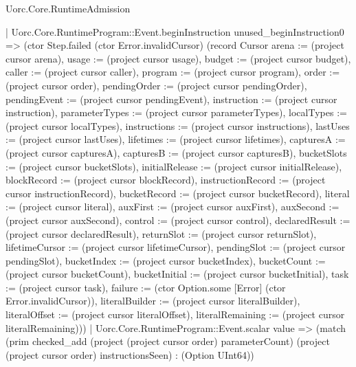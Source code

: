\begin{lexlean}{Uorc.Core.RuntimeAdmission}
\begin{semanticmodule}
{          | Uorc.Core.RuntimeProgram::Event.beginInstruction unused_beginInstruction0 => (ctor Step.failed (ctor Error.invalidCursor) (record Cursor {arena := (project cursor arena), usage := (project cursor usage), budget := (project cursor budget), caller := (project cursor caller), program := (project cursor program), order := (project cursor order), pendingOrder := (project cursor pendingOrder), pendingEvent := (project cursor pendingEvent), instruction := (project cursor instruction), parameterTypes := (project cursor parameterTypes), localTypes := (project cursor localTypes), instructions := (project cursor instructions), lastUses := (project cursor lastUses), lifetimes := (project cursor lifetimes), capturesA := (project cursor capturesA), capturesB := (project cursor capturesB), bucketSlots := (project cursor bucketSlots), initialRelease := (project cursor initialRelease), blockRecord := (project cursor blockRecord), instructionRecord := (project cursor instructionRecord), bucketRecord := (project cursor bucketRecord), literal := (project cursor literal), auxFirst := (project cursor auxFirst), auxSecond := (project cursor auxSecond), control := (project cursor control), declaredResult := (project cursor declaredResult), returnSlot := (project cursor returnSlot), lifetimeCursor := (project cursor lifetimeCursor), pendingSlot := (project cursor pendingSlot), bucketIndex := (project cursor bucketIndex), bucketCount := (project cursor bucketCount), bucketInitial := (project cursor bucketInitial), task := (project cursor task), failure := (ctor Option.some [Error] (ctor Error.invalidCursor)), literalBuilder := (project cursor literalBuilder), literalOffset := (project cursor literalOffset), literalRemaining := (project cursor literalRemaining)}))
          | Uorc.Core.RuntimeProgram::Event.scalar value => (match (prim checked_add (project (project cursor order) parameterCount) (project (project cursor order) instructionsSeen) : (Option UInt64))
}
\end{semanticmodule}
\end{lexlean}
